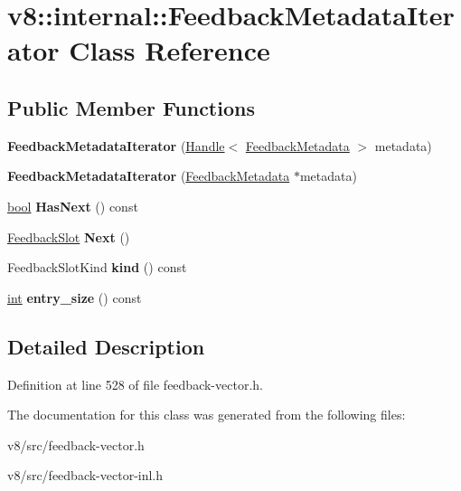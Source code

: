 \hypertarget{classv8_1_1internal_1_1FeedbackMetadataIterator}{}\section{v8\+:\+:internal\+:\+:Feedback\+Metadata\+Iterator Class Reference}
\label{classv8_1_1internal_1_1FeedbackMetadataIterator}
\subsection*{Public Member Functions}
\begin{DoxyCompactItemize}
\item 
\mbox{\label{classv8_1_1internal_1_1FeedbackMetadataIterator_a1859d01d207725bd38bdd59296b0be75}} 
{\bfseries Feedback\+Metadata\+Iterator} (\mbox{\hyperlink{classv8_1_1internal_1_1Handle}{Handle}}$<$ \mbox{\hyperlink{classv8_1_1internal_1_1FeedbackMetadata}{Feedback\+Metadata}} $>$ metadata)
\item 
\mbox{\label{classv8_1_1internal_1_1FeedbackMetadataIterator_a6ef82f6cffde0b55396399de11a41816}} 
{\bfseries Feedback\+Metadata\+Iterator} (\mbox{\hyperlink{classv8_1_1internal_1_1FeedbackMetadata}{Feedback\+Metadata}} $\ast$metadata)
\item 
\mbox{\label{classv8_1_1internal_1_1FeedbackMetadataIterator_a1117db6c3c1451dc48a128b724eb3860}} 
\mbox{\hyperlink{classbool}{bool}} {\bfseries Has\+Next} () const
\item 
\mbox{\label{classv8_1_1internal_1_1FeedbackMetadataIterator_a3bc1057f0476e96daeb538004a7a0d1d}} 
\mbox{\hyperlink{classv8_1_1internal_1_1FeedbackSlot}{Feedback\+Slot}} {\bfseries Next} ()
\item 
\mbox{\label{classv8_1_1internal_1_1FeedbackMetadataIterator_ab6566e14239035b5e77a91de0844d2c2}} 
Feedback\+Slot\+Kind {\bfseries kind} () const
\item 
\mbox{\label{classv8_1_1internal_1_1FeedbackMetadataIterator_a9948c6e28e9ed229a5a248289f79a1e3}} 
\mbox{\hyperlink{classint}{int}} {\bfseries entry\+\_\+size} () const
\end{DoxyCompactItemize}


\subsection{Detailed Description}


Definition at line 528 of file feedback-\/vector.\+h.



The documentation for this class was generated from the following files\+:\begin{DoxyCompactItemize}
\item 
v8/src/feedback-\/vector.\+h\item 
v8/src/feedback-\/vector-\/inl.\+h\end{DoxyCompactItemize}
